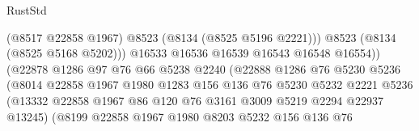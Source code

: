 \begin{lexlean}{RustStd}
\begin{coremodule}
{\begin{coremodule}
{{{{{{{{{{{{{{{{{{{{{{{{{{{{{{{{{{{{{{{{{{{{{{{{{{{{{                                          (@8517 @22858 @1967)
                                          @8523
                                          (@8134 (@8525 @5196 @2221)))
                                        @8523
                                        (@8134 (@8525 @5168 @5202)))
                                      @16533
                                      @16536
                                      @16539
                                      @16543
                                      @16548
                                      @16554))
                                  (@22878
                                    @1286
                                    @97
                                    @76
                                    @66
                                    @5238
                                    @2240
                                    (@22888
                                      @1286
                                      @76
                                      @5230
                                      @5236
                                      (@8014
                                        @22858
                                        @1967
                                        @1980
                                        @1283
                                        @156
                                        @136
                                        @76
                                        @5230
                                        @5232
                                        @2221
                                        @5236
                                        (@13332
                                          @22858
                                          @1967
                                          @86
                                          @120
                                          @76
                                          @3161
                                          @3009
                                          @5219
                                          @2294
                                          @22937
                                          @13245)
                                        (@8199
                                          @22858
                                          @1967
                                          @1980
                                          @8203
                                          @5232
                                          @156
                                          @136
                                          @76
}}}}}}}}}}}}}}}}}}}}}}}}}}}}}}}}}}}}}}}}}}}}}}}}}}}}}
\end{coremodule}}
\end{coremodule}
\end{lexlean}
